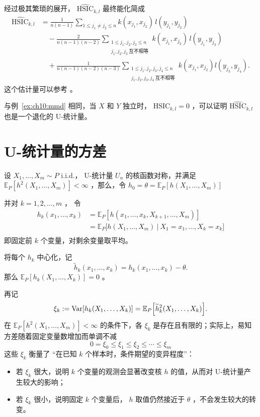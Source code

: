 \begin{example}
经过极其繁琐的展开， $\widehat{\mathrm{HSIC}}_{k,l}$ 最终能化简成\[\begin{aligned} \widehat{\mathrm{HSIC}}_{k,l} &= \frac{1}{n(n-1)} \sum_{1 \le j_1 \neq j_2 \le n} k(x_{j_1}, x_{j_2})\, l(y_{j_1}, y_{j_2}) \\ &\quad - \frac{2}{n(n-1)(n-2)} \sum_{\substack{1 \le j_1,j_2,j_3 \le n \\ j_1,j_2,j_3\ \text{互不相等}}} k(x_{j_1}, x_{j_2})\, l(y_{j_1}, y_{j_3}) \\ &\quad + \frac{1}{n(n-1)(n-2)(n-3)} \sum_{\substack{1 \le j_1,j_2,j_3,j_4 \le n \\ j_1,j_2,j_3,j_4\ \text{互不相等}}} k(x_{j_1}, x_{j_2})l(y_{j_3}, y_{j_4}). \end{aligned}\]
这个估计量可以参考 \cite{song2007,song2012}。


与例~\ref{ex:ch10:mmd} 相同，当 $X$ 和 $Y$ 独立时， $\mathrm{HSIC}_{k,l}=0$ ，可以证明 $\widehat{\mathrm{HSIC}}_{k,l}$ 也是一个退化的 U-统计量。


\end{example}

\section{U-统计量的方差}

设 $X_1,\dots,X_m\sim P$ i.i.d.， U-统计量 $U_n$ 的核函数对称，并满足 $\mathbb E_P[h^2(X_1,\dots,X_m)]<\infty$ ，那么，令 $h_0=\theta=\mathbb E_P[h(X_1,\dots,X_m)]$

并对 $k=1,2,\dots,m$ ， 令
\[\begin{aligned} h_k(x_1,\dots,x_k)&=\mathbb E_P[h(x_1,\dots,x_k,X_{k+1},\dots,X_m)]\\ &=\mathbb E_P\Big[h(X_1,\dots,X_m)\ \Big|\  X_1=x_1,\dots,X_k=x_k\Big]\\ \end{aligned}\]
即固定前 $k$ 个变量，对剩余变量取平均。

将每个 $h_k$ 中心化，记
\[
\widetilde h_k(x_1,\dots,x_k)=h_{k}(x_1,\dots,x_k)-\theta.
\]
那么 $\mathbb E_P[h_k(X_1,\dots,X_k)]=0$ 。

再记
\[
\xi_k := \mathrm{Var}[h_k(X_1,\ldots,X_k)] = \mathbb{E}_P\Bigl[\widetilde{h}_k^2(X_1,\dots,X_k)\Bigr].
\]
在 $\mathbb E_P[h^2(X_1,\dots,X_m)]<\infty$ 的条件下，各 $\xi_k$ 是存在且有限的；实际上，易知方差随着固定变量数增加而单调不减
\[0 = \xi_0 \le \xi_1 \le \xi_2 \le \cdots \le \xi_m\]
这些 $\xi_k$ 衡量了 ``在已知 $k$ 个样本时，条件期望的变异程度''：
\begin{itemize}
\tightlist
\item
  若 $\xi_k$ 很大，说明 $k$ 个变量的观测会显著改变核 $h$ 的值，从而对 U-统计量产生较大的影响；
\item
  若 $\xi_k$ 很小，说明固定 $k$ 个变量后， $h$ 取值仍然接近于 $\theta$ ，不会发生较大的转变。
\end{itemize}

